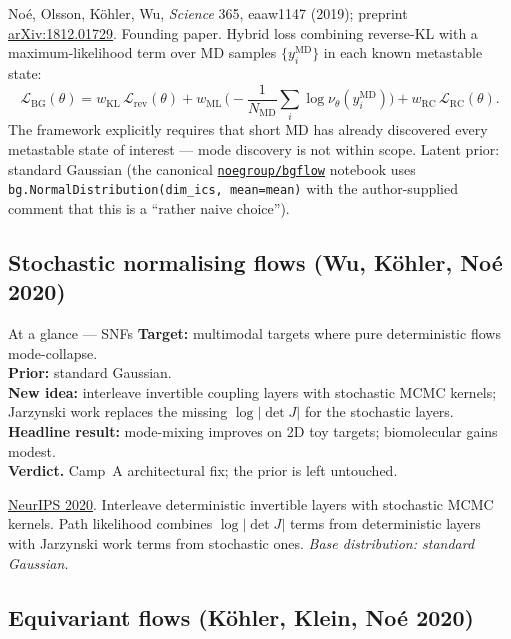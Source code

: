 \documentclass[11pt,letterpaper]{article}
\theoremstyle{plain}
\begin{document}
Noé, Olsson, Köhler, Wu, \emph{Science} 365, eaaw1147 (2019); preprint
\href{https://arxiv.org/abs/1812.01729}{arXiv:1812.01729}. Founding paper. Hybrid
loss combining reverse-KL with a maximum-likelihood term over MD samples
$\{y_i^{\mathrm{MD}}\}$ in each known metastable state:
\[
  \mathcal L_{\mathrm{BG}}(\theta) = w_{\mathrm{KL}}\,\mathcal L_{\mathrm{rev}}(\theta)
   + w_{\mathrm{ML}}\,\Big(\!-\!\frac{1}{N_{\mathrm{MD}}}\sum_i\log\nu_\theta(y_i^{\mathrm{MD}})\Big) + w_{\mathrm{RC}}\,\mathcal L_{\mathrm{RC}}(\theta).
\]
The framework explicitly requires that short MD has already discovered every
metastable state of interest --- mode discovery is not within scope. Latent prior:
standard Gaussian (the canonical
\href{https://github.com/noegroup/bgflow}{\texttt{noegroup/bgflow}} notebook uses
\verb|bg.NormalDistribution(dim_ics, mean=mean)| with the author-supplied comment
that this is a ``rather naive choice'').

\subsection{Stochastic normalising flows (Wu, Köhler, Noé 2020)}

\begin{methodbox}{At a glance --- SNFs}
\textbf{Target:} multimodal targets where pure deterministic flows mode-collapse.\\
\textbf{Prior:} standard Gaussian.\\
\textbf{New idea:} interleave invertible coupling layers with stochastic MCMC kernels; Jarzynski work replaces the missing $\log|\det J|$ for the stochastic layers.\\
\textbf{Headline result:} mode-mixing improves on 2D toy targets; biomolecular gains modest.\\
\textbf{Verdict.} Camp~A architectural fix; the prior is left untouched.
\end{methodbox}

\href{https://proceedings.neurips.cc/paper/2020/file/41d80bfc327ef980528426fc810a6d7a-Paper.pdf}{NeurIPS 2020}.
Interleave deterministic invertible layers with stochastic MCMC kernels. Path
likelihood combines $\log|\det J|$ terms from deterministic layers with Jarzynski
work terms from stochastic ones. \emph{Base distribution: standard Gaussian.}

\subsection{Equivariant flows (Köhler, Klein, Noé 2020)}
\end{document}

